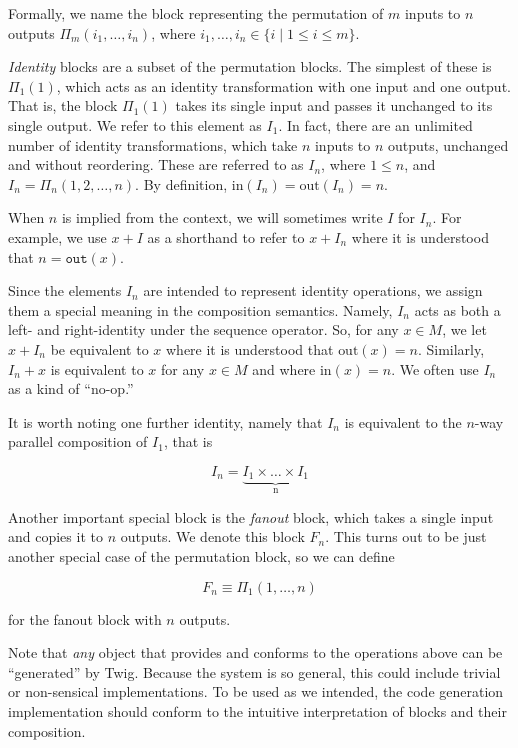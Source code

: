 Formally, we name the block representing the permutation of $m$ inputs to $n$ outputs $\Pi_m(i_1,\ldots,i_n)$, where $i_1,\ldots,i_n \in \lbrace i \;|\; 1 \leq i \leq m \rbrace$.

\emph{Identity} blocks are a subset of the permutation blocks. The simplest of these is $\Pi_1(1)$, which acts as an identity transformation with one input and one output. That is, the block $\Pi_1(1)$ takes its single input and passes it unchanged to its single output. We refer to this element as $I_1$. In fact, there are an unlimited number of identity transformations, which take $n$ inputs to $n$ outputs, unchanged and without reordering. These are referred to as $I_n$, where $1 \leq n$, and $I_n = \Pi_n(1,2,\ldots,n)$. By definition, $\mbox{in}(I_n) = \mbox{out}(I_n) = n$.

When $n$ is implied from the context, we will sometimes write $I$ for $I_n$. For example, we use $x+I$ as a shorthand to refer to $x+I_n$ where it is understood that $n = \mathtt{out}(x)$.

Since the elements $I_n$ are intended to represent identity operations, we assign them a special meaning in the composition semantics. Namely, $I_n$ acts as both a left- and right-identity under the sequence operator. So, for any $x \in M$, we let $x + I_n$ be equivalent to $x$ where it is understood that $\mbox{out}(x) = n$. Similarly, $I_n + x$ is equivalent to $x$ for any $x \in M$ and where $\mbox{in}(x) = n$. We often use $I_n$ as a kind of ``no-op.''

It is worth noting one further identity, namely that $I_n$ is equivalent to the $n$-way parallel composition of $I_1$, that is

\[
I_n = \underbrace{I_1 \times \ldots \times I_1}_\text{n}
\]

Another important special block is the \emph{fanout} block, which takes a single input and copies it to $n$ outputs. We denote this block $F_n$. This turns out to be just another special case of the permutation block, so we can define 

\[
F_n \equiv \Pi_1(1,\ldots,n) 
\]

for the fanout block with $n$ outputs.

Note that \emph{any} object that provides and conforms to the operations above can be ``generated'' by Twig. Because the system is so general, this could include trivial or non-sensical implementations. To be used as we intended, the code generation implementation should conform to the intuitive interpretation of blocks and their composition.



